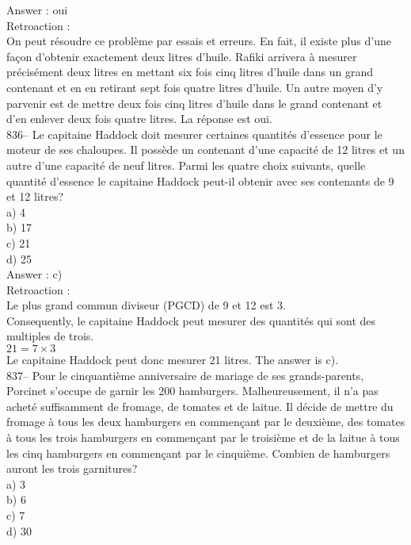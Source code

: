 ﻿\documentclass[letterpaper, 12pt]{article}
\begin{document}
Answer : oui\\

Retroaction : \\
On peut r\'esoudre ce probl\`eme par essais et erreurs. En fait, il
existe plus d'une fa\c con d'obtenir exactement deux litres d'huile.
Rafiki arrivera \`a mesurer pr\'ecis\'ement deux litres en mettant
six fois cinq litres d'huile dans un grand contenant et en en
retirant sept fois quatre litres d'huile.  Un autre moyen d'y
parvenir est de mettre deux fois cinq litres d'huile
dans le grand contenant et d'en enlever deux fois quatre litres. La
r\'eponse est oui.\\

836-- Le capitaine Haddock doit mesurer certaines quantit\'es d'essence pour
le moteur de ses chaloupes.  Il poss\`ede un contenant d'une capacit\'e de
12 litres et un autre d'une capacit\'e de neuf litres.  Parmi les quatre
choix suivants, quelle quantit\'e d'essence le capitaine Haddock peut-il
obtenir avec ses contenants de 9 et 12 litres?\\
a) 4\\
b) 17\\
c) 21\\
d) 25\\

Answer : c)\\

Retroaction : \\
Le plus grand commun diviseur (PGCD) de 9 et 12 est 3. \\
Consequently, le capitaine Haddock peut mesurer des quantit\'es qui sont
des multiples de trois.  \\
$21=7\times3$\\
Le capitaine Haddock peut donc mesurer 21 litres.  The answer is c).\\

837-- Pour le cinquanti\`eme anniversaire de mariage de ses grands-parents,
Porcinet s'occupe de garnir les 200 hamburgers.  Malheureusement, il n'a pas
achet\'e suffisamment de fromage, de tomates et de laitue.  Il d\'ecide de
mettre du fromage \`a tous les deux hamburgers en commen\c cant par le
deuxi\`eme, des tomates \`a tous les trois hamburgers en commen\c cant par
le troisi\`eme et de la laitue \`a tous les cinq hamburgers en commen\c cant
par le cinqui\`eme.  Combien de hamburgers auront les trois garnitures?\\
a) 3\\
b) 6\\
c) 7\\
d) 30\\
\end{document}
